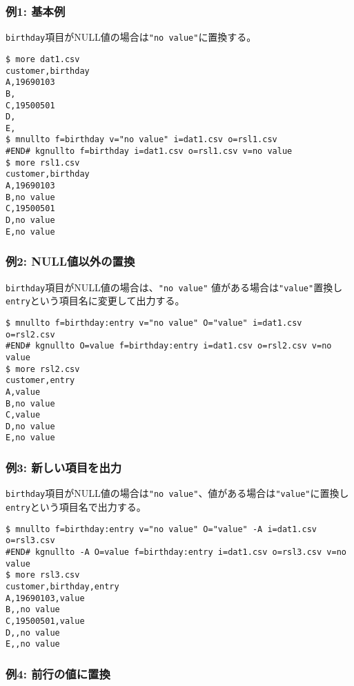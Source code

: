 \subsubsection*{例1: 基本例}

\verb|birthday|項目がNULL値の場合は\verb|"no value"|に置換する。


\begin{Verbatim}[baselinestretch=0.7,frame=single]
$ more dat1.csv
customer,birthday
A,19690103
B,
C,19500501
D,
E,
$ mnullto f=birthday v="no value" i=dat1.csv o=rsl1.csv
#END# kgnullto f=birthday i=dat1.csv o=rsl1.csv v=no value
$ more rsl1.csv
customer,birthday
A,19690103
B,no value
C,19500501
D,no value
E,no value
\end{Verbatim}
\subsubsection*{例2: NULL値以外の置換}

\verb|birthday|項目がNULL値の場合は、\verb|"no value"|
値がある場合は\verb|"value"|置換し\verb|entry|という項目名に変更して出力する。


\begin{Verbatim}[baselinestretch=0.7,frame=single]
$ mnullto f=birthday:entry v="no value" O="value" i=dat1.csv o=rsl2.csv
#END# kgnullto O=value f=birthday:entry i=dat1.csv o=rsl2.csv v=no value
$ more rsl2.csv
customer,entry
A,value
B,no value
C,value
D,no value
E,no value
\end{Verbatim}
\subsubsection*{例3: 新しい項目を出力}

\verb|birthday|項目がNULL値の場合は\verb|"no value"|、値がある場合は\verb|"value"|に置換し\verb|entry|という項目名で出力する。


\begin{Verbatim}[baselinestretch=0.7,frame=single]
$ mnullto f=birthday:entry v="no value" O="value" -A i=dat1.csv o=rsl3.csv
#END# kgnullto -A O=value f=birthday:entry i=dat1.csv o=rsl3.csv v=no value
$ more rsl3.csv
customer,birthday,entry
A,19690103,value
B,,no value
C,19500501,value
D,,no value
E,,no value
\end{Verbatim}
\subsubsection*{例4: 前行の値に置換}



